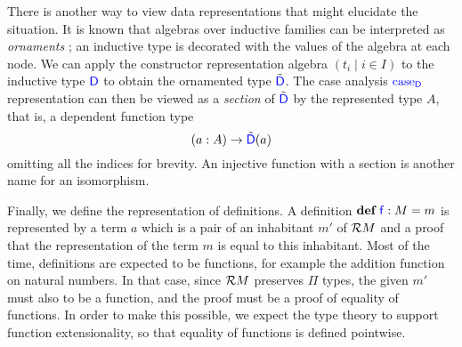 There is another way to view data representations that might elucidate the
situation. It is known that algebras over inductive families can be interpreted
as \emph{ornaments} \cite{Dagand2017-nj}; an inductive type is decorated with
the values of the algebra at each node. We can apply the constructor
representation algebra $(t_i \mid i \in I)$ to the inductive type ${\color{blue}{\mathsf{D}}}$ to
obtain the ornamented type $\tilde{{\color{blue}{\mathsf{D}}}}$. The case analysis ${\color{blue}{\mathsf{\textrm{case}_{D}}}}$
representation can then be viewed as a \emph{section} of $\tilde{{\color{blue}{\mathsf{D}}}}$ by
the represented type $A$, that is, a dependent function type
\[
  (a : A) \to \tilde{{\color{blue}{\mathsf{D}}}}(a)
\]
omitting all the indices for brevity. An injective function with a section is
another name for an isomorphism.

Finally, we define the representation of definitions. A definition
$\textbf{def} \ {\color{blue}{\mathsf{f}}} : {M} = {m}$ is represented by a term $a$ which is a pair of an inhabitant
$m'$ of $\mathcal{R} {M}$ and a proof that the representation of the term $m$ is
equal to this inhabitant. Most of the time, definitions are expected to be
functions, for example the addition function on natural numbers. In that case,
since $\mathcal{R} {M}$ preserves $\Pi$ types, the given $m'$ must also to be a
function, and the proof must be a proof of equality of functions. In order to
make this possible, we expect the type theory to support function
extensionality, so that equality of functions is defined pointwise. 

